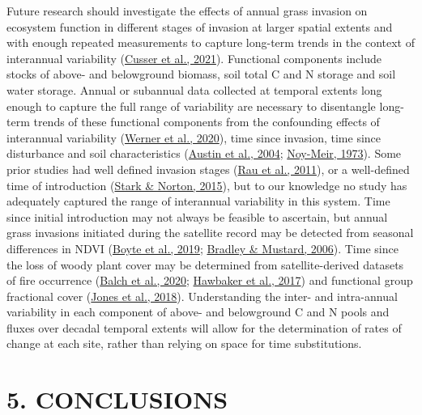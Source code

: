 \documentclass[
  11pt,
  a4paper,
]{article}
\begin{document}
Future research should investigate the effects of annual grass invasion on ecosystem function in different stages of invasion at larger spatial extents and with enough repeated measurements to capture long-term trends in the context of interannual variability (\protect\hyperlink{ref-Cusser2021}{Cusser et al., 2021}). Functional components include stocks of above- and belowground biomass, soil total C and N storage and soil water storage. Annual or subannual data collected at temporal extents long enough to capture the full range of variability are necessary to disentangle long-term trends of these functional components from the confounding effects of interannual variability (\protect\hyperlink{ref-Werner2020}{Werner et al., 2020}), time since invasion, time since disturbance and soil characteristics (\protect\hyperlink{ref-Austin2004}{Austin et al., 2004}; \protect\hyperlink{ref-Noy-Meir1973}{Noy-Meir, 1973}). Some prior studies had well defined invasion stages (\protect\hyperlink{ref-Rau2011}{Rau et al., 2011}), or a well-defined time of introduction (\protect\hyperlink{ref-Stark2015}{Stark \& Norton, 2015}), but to our knowledge no study has adequately captured the range of interannual variability in this system. Time since initial introduction may not always be feasible to ascertain, but annual grass invasions initiated during the satellite record may be detected from seasonal differences in NDVI (\protect\hyperlink{ref-Boyte2019}{Boyte et al., 2019}; \protect\hyperlink{ref-Bradley2006}{Bradley \& Mustard, 2006}). Time since the loss of woody plant cover may be determined from satellite-derived datasets of fire occurrence (\protect\hyperlink{ref-Balch2020fired}{Balch et al., 2020}; \protect\hyperlink{ref-Hawbaker2017}{Hawbaker et al., 2017}) and functional group fractional cover (\protect\hyperlink{ref-Jones2018}{Jones et al., 2018}). Understanding the inter- and intra-annual variability in each component of above- and belowground C and N pools and fluxes over decadal temporal extents will allow for the determination of rates of change at each site, rather than relying on space for time substitutions.

\hypertarget{conclusions}{%
\section{5. CONCLUSIONS}\label{conclusions}}
\end{document}

